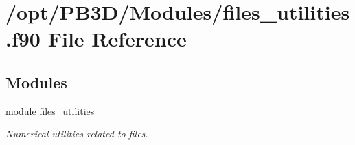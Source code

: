 \hypertarget{files__utilities_8f90}{}\section{/opt/\+P\+B3\+D/\+Modules/files\+\_\+utilities.f90 File Reference}
\label{files__utilities_8f90}
\subsection*{Modules}
\begin{DoxyCompactItemize}
\item 
module \hyperlink{namespacefiles__utilities}{files\+\_\+utilities}
\begin{DoxyCompactList}\small\item\em Numerical utilities related to files. \end{DoxyCompactList}\end{DoxyCompactItemize}
